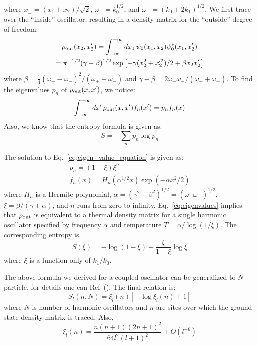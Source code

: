 \documentclass[%
 mph,%
 reprint,%
]{revtex4-2}
\def\rout{\rho_{\rm out}}
\def\op{\omega_+}
\def\om{\omega_-}
\begin{document}
where \(x_\pm=(x_1\pm x_2)/\sqrt2\), \(\op=k_0^{1/2}\),
and \(\om=(k_0+2k_1)^{1/2}\).
We first trace over the ``inside'' oscillator, resulting in a density matrix for the ``outside'' degree of freedom:
\begin{equation}
    \begin{gathered}
    \rout(x_2,x'_2) = \int_{-\infty}^{+\infty} dx_1\,\psi_0(x_1,x_2)
                                                \psi^*_0(x_1,x'_2) \\
        = \pi^{-1/2}(\gamma-\beta)^{1/2}
       \exp\left[-\gamma(x_2^2+x^{\prime 2}_2)/2+\beta x_2x'_2\right]
    \end{gathered}
\end{equation}
where $\beta=\frac14(\op-\om)^2/(\op+\om)$ and
$\gamma-\beta=2\op\om/(\op+\om)$.
To find the eigenvalues $p_n$ of $\rout(x,x')$, we notice:
\begin{equation}
    \label{eq:eigen_value_equation}
    \int_{-\infty}^{+\infty}dx'\,\rout(x,x')f_n(x')=p_n f_n(x)
\end{equation}
Also, we know that the entropy formula is given as:
\begin{equation}
    S=-\sum_n p_n\log p_n
\end{equation}

The solution to Eq.~\ref{eq:eigen_value_equation} is given as:
\begin{equation}
\label{eq:eigenvalues}
    \begin{gathered}
        p_n = (1-\xi)\xi^n\\
        f_n(x) = H_n(\alpha^{1/2}x)\exp(-\alpha x^2/2)
    \end{gathered}
\end{equation}
where $H_n$ is a Hermite polynomial,
$\alpha=(\gamma^2-\beta^2)^{1/2}=(\op\om)^{1/2}$,
$\xi=\beta/(\gamma+\alpha)$, and $n$ runs from zero to infinity.
Eq.~\ref{eq:eigenvalues} implies that $\rout$ is equivalent to a thermal density matrix for a single harmonic oscillator specified by frequency $\alpha$ and temperature $T=\alpha/\log(1/\xi)$.  The corresponding entropy is
\begin{equation}
    S(\xi)=-\log(1-\xi)-\frac{\xi}{1 - \xi}\log\xi
\end{equation}
where $\xi$ is a function only of  $k_1/k_0$.

The above formula we derived for a coupled oscillator can be generalized to \(N\) particle, for details one can Ref~(). The final relation is:
\begin{equation}
    S_l(n,N)=\xi_l(n)\left[-\log\xi_l(n)+1\right]
\end{equation}
where \(N\) is number of harmonic oscillators and \(n\) are sites over which the ground state density matrix is traced. Also, \begin{equation}
    \xi_l(n)=\frac{n(n+1)(2n+1)^2}{64 l^2 (l+1)^2}+O(l^{-6})
\end{equation}
\end{document}
